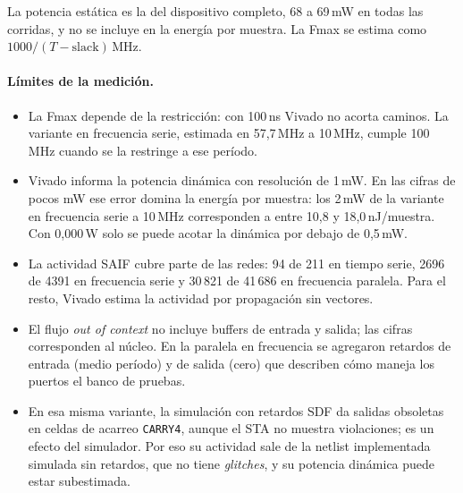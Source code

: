 La potencia estática es la del dispositivo completo, 68 a 69\,mW en todas las corridas, y no se incluye en la energía por muestra. La Fmax se estima como $1000/(T - \text{slack})$\,MHz.

\paragraph{Límites de la medición.}
\begin{itemize}
  \item La Fmax depende de la restricción: con 100\,ns Vivado no acorta caminos. La variante en frecuencia serie, estimada en 57,7\,MHz a 10\,MHz, cumple 100\,MHz cuando se la restringe a ese período.
  \item Vivado informa la potencia dinámica con resolución de 1\,mW. En las cifras de pocos mW ese error domina la energía por muestra: los 2\,mW de la variante en frecuencia serie a 10\,MHz corresponden a entre 10,8 y 18,0\,nJ/muestra. Con 0,000\,W solo se puede acotar la dinámica por debajo de 0,5\,mW.
  \item La actividad SAIF cubre parte de las redes: 94 de 211 en tiempo serie, 2696 de 4391 en frecuencia serie y 30\,821 de 41\,686 en frecuencia paralela. Para el resto, Vivado estima la actividad por propagación sin vectores.
  \item El flujo \emph{out of context} no incluye buffers de entrada y salida; las cifras corresponden al núcleo. En la paralela en frecuencia se agregaron retardos de entrada (medio período) y de salida (cero) que describen cómo maneja los puertos el banco de pruebas.
  \item En esa misma variante, la simulación con retardos SDF da salidas obsoletas en celdas de acarreo \texttt{CARRY4}, aunque el STA no muestra violaciones; es un efecto del simulador. Por eso su actividad sale de la netlist implementada simulada sin retardos, que no tiene \emph{glitches}, y su potencia dinámica puede estar subestimada.
\end{itemize}
